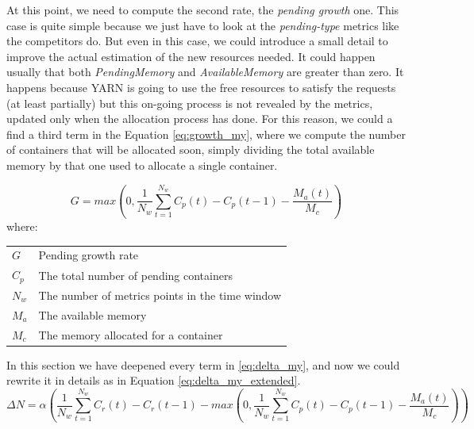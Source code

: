 \documentclass[12pt,twoside,cucitura]{toptesi}
\makeatletter
\newenvironment{conditions}
  {\par\vspace{\abovedisplayskip}\noindent\begin{tabular}{>{$}l<{$} @{${}={}$} l}}
  {\end{tabular}\par\vspace{\belowdisplayskip}}
\makeatother
\begin{document}
At this point, we need to compute the second rate, the \textit{pending growth} one. This case is quite simple because we just have to look at the \textit{pending-type} metrics like the competitors do. But even in this case, we could introduce a small detail to improve the actual estimation of the new resources needed. It could happen usually that both \textit{PendingMemory} and \textit{AvailableMemory} are greater than zero. It happens because YARN is going to use the free resources to satisfy the requests (at least partially) but this on-going process is not revealed by the metrics, updated only when the allocation process has done. For this reason, we could a find a third term in the Equation \ref{eq:growth_my}, where we compute the number of containers that will be allocated soon, simply dividing the total available memory by that one used to allocate a single container.

\begin{equation} \label{eq:growth_my}
G = max(0,\frac{1}{N_{w} }\sum_{t = 1}^{N_{w} }C_{p}(t)-C_{p}(t-1)-\frac{M_{a}(t)}{M_{c}})
\end{equation}
where:
\begin{conditions}
 G     &  Pending growth rate \\
C_{p}    &  The total number of pending containers \\  
N_{w}    &   The number of metrics points in the time window  \\
M_{a} & The available memory \\
M_{c}  & The memory allocated for a container
\end{conditions}

In this section we have deepened every term in \ref{eq:delta_my}, and now we could rewrite it in details as in Equation \ref{eq:delta_my_extended}.
\begin{equation} \label{eq:delta_my_extended}
\Delta N = \alpha(\frac{1}{N_{w} }\sum_{t = 1}^{N_{w} }C_{r}(t)-C_{r}(t-1) - max(0,\frac{1}{N_{w} }\sum_{t = 1}^{N_{w} }C_{p}(t)-C_{p}(t-1)-\frac{M_{a}(t)}{M_{c}}))
\end{equation}
\end{document}
